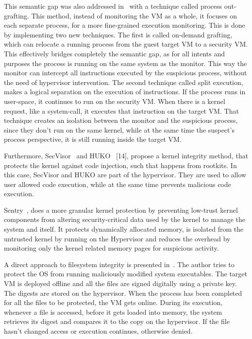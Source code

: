 \par This semantic gap was also addressed in~\cite{srinivasan2011process} with a technique called process out-grafting. This method, instead of monitoring the \ac{VM} as a whole, it focuses on each separate process, for a more fine-grained execution monitoring. This is done by implementing two new techniques. The first is called on-demand grafting, which can relocate a running process from the guest target \ac{VM} to a security \ac{VM}. This effectively bridges completely the semantic gap, as for all intents and purposes the process is running on the same system as the monitor. This way the monitor can intercept all instructions executed by the suspicious process, without the need of hypervisor intervention. The second technique called split execution, makes a logical separation on the execution of instructions. If the process runs in user-space, it continues to run on the security \ac{VM}. When there is a kernel request, like a system-call, it executes that instruction on the target \ac{VM}. That technique creates an isolation between the monitor and the suspicious process, since they don’t run on the same kernel, while at the same time the suspect’s process perspective, it is still running inside the target \ac{VM}. 


\par Furthermore, SecVisor~\cite{seshadri2007secvisor} and HUKO~\cite{xiong2011practical} [14], propose a kernel integrity method, that protects the kernel against code injection, such that happens from rootkits. In this case, SecVisor and HUKO are part of the hypervisor. They are used to allow user allowed code execution, while at the same time prevents malicious code execution.


\par Sentry~\cite{srivastava2012efficient}, does a more granular kernel protection by preventing low-trust kernel components from altering security-critical data used by the kernel to manage the system and itself. It protects dynamically allocated memory, is isolated from the untrusted kernel by running on the Hypervisor and reduces the overhead by monitoring only the kernel related memory pages for suspicious activity.


\par A direct approach to filesystem integrity is presented in~\cite{nasab2012security}. The author tries to protect the \ac{OS} from running maliciously modified system executables. The target \ac{VM} is deployed offline and all the files are signed digitally using a private key. The digests are stored on the hypervisor. When the process has been completed for all the files to be protected, the \ac{VM} gets online. During its execution, whenever a file is accessed, before it gets loaded into memory, the system retrieves its digest and compares it to the copy on the hypervisor. If the file hasn’t changed access or execution continues, otherwise denied.

